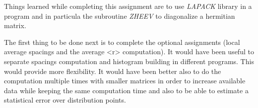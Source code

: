 \documentclass[11pt,a4paper]{article}
\begin{document}
Things learned while completing this assignment are to use \textit{LAPACK} library in a program and in particula the subroutine \textit{ZHEEV} to diagonalize a hermitian matrix.

The first thing to be done next is to complete the optional assignments (local average spacings and the average <r> computation).
It would have been useful to separate spacings computation and histogram building in different programs. This would provide more flexibility.
It would have been better also to do the computation multiple times with smaller matrices in order to increase available data while keeping the same computation time and also to be able to estimate a statistical error over distribution points.
	
\end{document}
